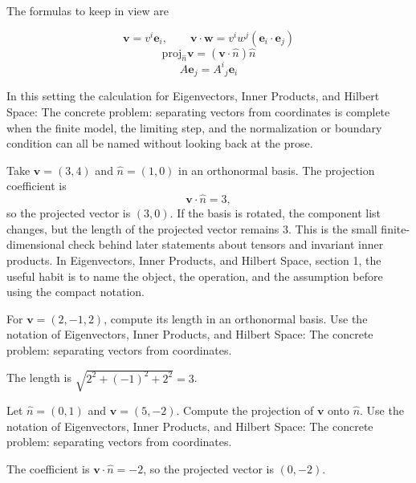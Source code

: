 The formulas to keep in view are

\[
  \bm v=v^i\bm e_i,\qquad \bm v\cdot\bm w=v^iw^j(\bm e_i\cdot\bm e_j)
\]
\[
  \mathrm{proj}_{\hat n}\bm v=(\bm v\cdot\hat n)\hat n
\]
\[
  A\bm e_j=A^i{}_j\bm e_i
\]

In this setting the calculation for Eigenvectors, Inner Products, and Hilbert Space: The concrete problem: separating vectors from coordinates is complete when the finite model, the limiting step, and the normalization or boundary condition can all be named without looking back at the prose.




\begin{example}
Take \(\bm v=(3,4)\) and \(\hat n=(1,0)\) in an orthonormal basis.  The projection coefficient is
\[
  \bm v\cdot\hat n=3,
\]
so the projected vector is \((3,0)\).  If the basis is rotated, the component list changes, but the length of the projected vector remains \(3\).  This is the small finite-dimensional check behind later statements about tensors and invariant inner products.  In Eigenvectors, Inner Products, and Hilbert Space, section 1, the useful habit is to name the object, the operation, and the assumption before using the compact notation.
\end{example}



\begin{exercise}
For \(\bm v=(2,-1,2)\), compute its length in an orthonormal basis.  Use the notation of Eigenvectors, Inner Products, and Hilbert Space: The concrete problem: separating vectors from coordinates.
\begin{answer}
The length is \(\sqrt{2^2+(-1)^2+2^2}=3\).
\end{answer}
\end{exercise}

\begin{exercise}
Let \(\hat n=(0,1)\) and \(\bm v=(5,-2)\).  Compute the projection of \(\bm v\) onto \(\hat n\).  Use the notation of Eigenvectors, Inner Products, and Hilbert Space: The concrete problem: separating vectors from coordinates.
\begin{answer}
The coefficient is \(\bm v\cdot\hat n=-2\), so the projected vector is \((0,-2)\).
\end{answer}
\end{exercise}



